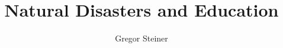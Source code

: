 \documentclass[11pt]{article}
\title{Natural Disasters and Education}
\author{Gregor Steiner}
\begin{document}
\maketitle

\begin{abstract}
\end{abstract}















\end{document}
